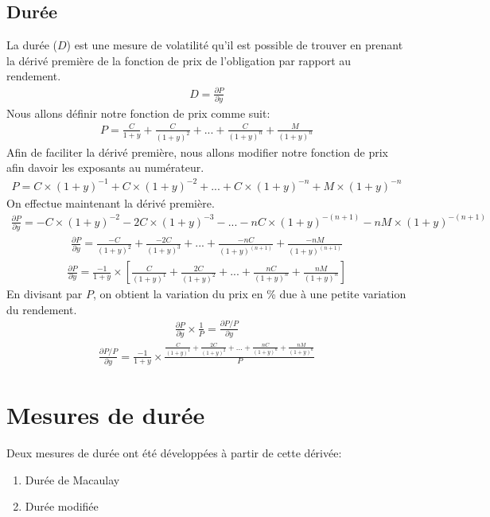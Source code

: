 \documentclass[12pt]{article}
\begin{document}
\subsection{Durée}
La durée ($D$) est une mesure de volatilité qu'il est possible de trouver en prenant la dérivé première de  la fonction de prix de l'obligation par rapport au rendement. 
\begin{align*}
D=\frac{\partial P}{\partial y}
\end{align*}
Nous allons définir notre fonction de prix comme suit:
\begin{align*}
P=\frac{C}{1+y}+\frac{C}{(1+y)^2}+...+\frac{C}{(1+y)^n}+\frac{M}{(1+y)^n}
\end{align*}
Afin de faciliter la dérivé première, nous allons modifier notre fonction de prix afin davoir les exposants au numérateur.
\begin{align*}
P=C \times (1+y)^{-1}+C \times (1+y)^{-2}+...+C \times (1+y)^{-n}+M \times (1+y)^{-n}
\end{align*}
On effectue maintenant la dérivé première.
\begin{align*}
\frac{\partial P}{\partial y}=-C \times (1+y)^{-2}-2C \times (1+y)^{-3}-...-nC \times (1+y)^{-(n+1)}-nM \times (1+y)^{-(n+1)}
\end{align*}
\begin{align*}
\frac{\partial P}{\partial y}=\frac{-C}{(1+y)^2}+\frac{-2C}{(1+y)^3}+...+\frac{-nC}{(1+y)^{(n+1)}}+\frac{-nM}{(1+y)^{(n+1)}}
\end{align*}
\begin{align*}
\frac{\partial P}{\partial y}= \frac{-1}{1+y} \times \left[ \frac{C}{(1+y)^1}+\frac{2C}{(1+y)^2}+...+\frac{nC}{(1+y)^{n}}+\frac{nM}{(1+y)^{n}} \right]
\end{align*}
En divisant par $P$, on obtient la variation du prix en \% due à une petite variation du rendement.
\begin{align*}
\frac{\partial P}{\partial y} \times \frac{1}{P}=\frac{\partial P/P}{\partial y} 
\end{align*}
\begin{align*}
\frac{\partial P/P}{\partial y} = \frac{-1}{1+y} \times \frac{\frac{C}{(1+y)^1}+\frac{2C}{(1+y)^2}+...+\frac{nC}{(1+y)^{n}}+\frac{nM}{(1+y)^{n}}}{P}
\end{align*}
\section{Mesures de durée}
Deux mesures de durée ont été développées à partir de cette dérivée: 
\begin{enumerate}
\item Durée de Macaulay
\item Durée modifiée
\end{enumerate}
\end{document}
